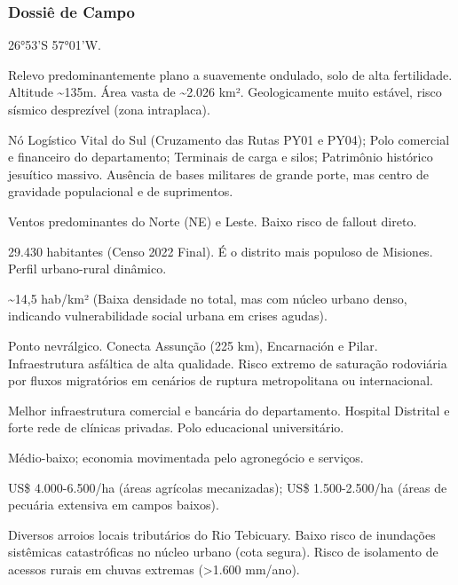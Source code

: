 \subsubsection{Dossiê de Campo}
\begin{description}[style=nextline,leftmargin=0.5cm,font=\bfseries]
\item[Coordenadas]  26°53'S 57°01'W.
\item[Topografia]  Relevo predominantemente plano a suavemente ondulado, solo de alta fertilidade. Altitude \textasciitilde 135m. Área vasta de \textasciitilde 2.026 km². Geologicamente muito estável, risco sísmico desprezível (zona intraplaca).
\item[Alvos Estratégicos]  Nó Logístico Vital do Sul (Cruzamento das Rutas PY01 e PY04); Polo comercial e financeiro do departamento; Terminais de carga e silos; Patrimônio histórico jesuítico massivo. Ausência de bases militares de grande porte, mas centro de gravidade populacional e de suprimentos.
\item[Fallout]  Ventos predominantes do Norte (NE) e Leste. Baixo risco de fallout direto.
\item[População]  29.430 habitantes (Censo 2022 Final). É o distrito mais populoso de Misiones. Perfil urbano-rural dinâmico.
\item[Densidade]  \textasciitilde 14,5 hab/\allowbreak km² (Baixa densidade no total, mas com núcleo urbano denso, indicando vulnerabilidade social urbana em crises agudas).
\item[Vias de Acesso]  Ponto nevrálgico. Conecta Assunção (225 km), Encarnación e Pilar. Infraestrutura asfáltica de alta qualidade. Risco extremo de saturação rodoviária por fluxos migratórios em cenários de ruptura metropolitana ou internacional.
\item[Serviços]  Melhor infraestrutura comercial e bancária do departamento. Hospital Distrital e forte rede de clínicas privadas. Polo educacional universitário.
\item[Custo de Vida]  Médio-baixo; economia movimentada pelo agronegócio e serviços.
\item[Preço da Terra]  US\$ 4.000-6.500/\allowbreak ha (áreas agrícolas mecanizadas); US\$ 1.500-2.500/\allowbreak ha (áreas de pecuária extensiva em campos baixos).
\item[Hidrologia]  Diversos arroios locais tributários do Rio Tebicuary. Baixo risco de inundações sistêmicas catastróficas no núcleo urbano (cota segura). Risco de isolamento de acessos rurais em chuvas extremas (>1.600 mm/\allowbreak ano).

\end{description}
